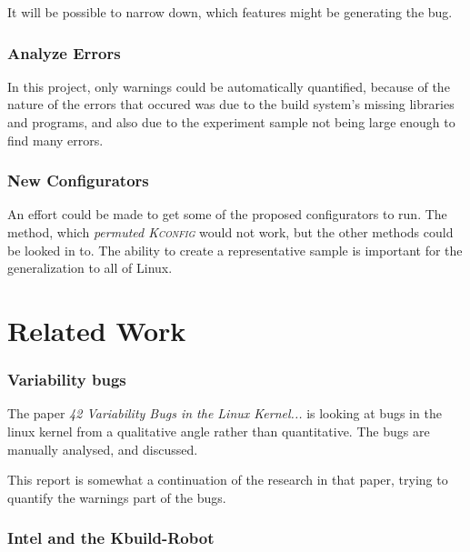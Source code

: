 \documentclass[a4paper,11pt]{report}
\begin{document}
It will be possible to narrow down, which features might be generating the bug.


            \subsection*{Analyze Errors}

In this project, only warnings could be automatically quantified, because of the
nature of the errors that occured was due to the build system's missing 
libraries and programs, and also due to the experiment sample not being large enough to 
find many errors.

            \subsection*{New Configurators}

An effort could be made to get some of the proposed configurators to run. The 
method, which \emph{permuted \textsc{Kconfig}} would not work, but the other
methods could be looked in to. The ability to create a representative sample 
is important for the generalization to all of Linux.


            \newpage
            \chapter{Related Work}

            \subsection*{Variability bugs}
The paper \emph{42 Variability Bugs in the Linux Kernel...}\cite{42bugs} is 
looking at bugs in the linux kernel from a qualitative angle rather than 
quantitative.  The bugs are manually analysed, and discussed.

This report is somewhat a continuation of the research in that paper, trying to 
quantify the warnings part of the bugs.


            \subsection*{Intel and the Kbuild-Robot}
\end{document}

